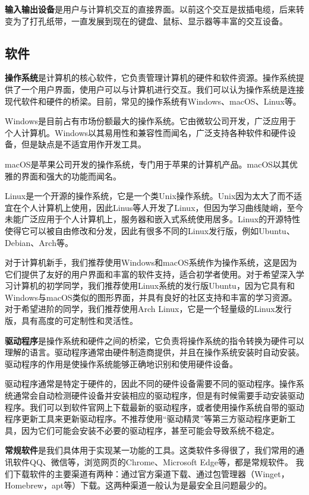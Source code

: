 \documentclass[12pt]{report}
\begin{document}
\textbf{输入输出设备}是用户与计算机交互的直接界面。以前这个交互是拔插电缆，后来转变为了打孔纸带，一直发展到现在的键盘、鼠标、显示器等丰富的交互设备。

\subsection{软件}

\textbf{操作系统}是计算机的核心软件，它负责管理计算机的硬件和软件资源。操作系统提供了一个用户界面，使用户可以与计算机进行交互。我们可以认为操作系统是连接现代软件和硬件的桥梁。目前，常见的操作系统有Windows、macOS、Linux等。

Windows是目前占有市场份额最大的操作系统。它由微软公司开发，广泛应用于个人计算机。Windows以其易用性和兼容性而闻名，广泛支持各种软件和硬件设备，但是缺点是不适宜用作开发工具。

macOS是苹果公司开发的操作系统，专门用于苹果的计算机产品。macOS以其优雅的界面和强大的功能而闻名。

Linux是一个开源的操作系统，它是一个类Unix操作系统。Unix因为太大了而不适宜在个人计算机上使用，因此Linus等人开发了Linux，但因为学习曲线陡峭，至今未能广泛应用于个人计算机上，服务器和嵌入式系统使用居多。Linux的开源特性使得它可以被自由修改和分发，因此有很多不同的Linux发行版，例如Ubuntu、Debian、Arch等。

对于计算机新手，我们推荐使用Windows和macOS系统作为操作系统，这是因为它们提供了友好的用户界面和丰富的软件支持，适合初学者使用。对于希望深入学习计算机的初学同学，我们推荐使用Linux系统的发行版Ubuntu，因为它具有和Windows与macOS类似的图形界面，并具有良好的社区支持和丰富的学习资源。对于希望进阶的同学，我们推荐使用Arch Linux，它是一个轻量级的Linux发行版，具有高度的可定制性和灵活性。

\textbf{驱动程序}是操作系统和硬件之间的桥梁，它负责将操作系统的指令转换为硬件可以理解的语言。驱动程序通常由硬件制造商提供，并且在操作系统安装时自动安装。驱动程序的作用是使操作系统能够正确地识别和使用硬件设备。

驱动程序通常是特定于硬件的，因此不同的硬件设备需要不同的驱动程序。操作系统通常会自动检测硬件设备并安装相应的驱动程序，但是有时候需要手动安装驱动程序。我们可以到软件官网上下载最新的驱动程序，或者使用操作系统自带的驱动程序更新工具来更新驱动程序。不推荐使用“驱动精灵”等第三方驱动程序更新工具，因为它们可能会安装不必要的驱动程序，甚至可能会导致系统不稳定。

\textbf{常规软件}是我们具体用于实现某一功能的工具。这类软件多得很了，我们常用的通讯软件QQ、微信等，浏览网页的Chrome、Microsoft Edge等，都是常规软件。
我们下载软件的主要渠道有两种：通过官方渠道下载、通过包管理器（Winget，Homebrew，apt等）下载。这两种渠道一般认为是最安全且问题最少的。
\end{document}
